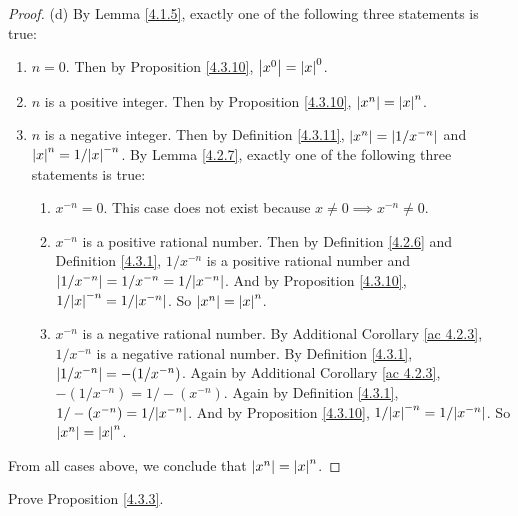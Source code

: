 \begin{proof}{(d)}
    By Lemma \ref{4.1.5}, exactly one of the following three statements is true:
    \begin{enumerate}[label=(\Roman*)]
        \item \(n = 0\).
              Then by Proposition \ref{4.3.10}, \(\abs*{x^0} = \abs*{x}^0\).
        \item \(n\) is a positive integer.
              Then by Proposition \ref{4.3.10}, \(\abs*{x^n} = \abs*{x}^n\).
        \item \(n\) is a negative integer.
              Then by Definition \ref{4.3.11}, \(\abs*{x^n} = \abs*{1 / x^{-n}}\) and \(\abs*{x}^n = 1 / \abs*{x}^{-n}\).
              By Lemma \ref{4.2.7}, exactly one of the following three statements is true:
              \begin{enumerate}[label=(\roman*)]
                  \item \(x^{-n} = 0\).
                        This case does not exist because \(x \neq 0 \implies x^{-n} \neq 0\).
                  \item \(x^{-n}\) is a positive rational number.
                        Then by Definition \ref{4.2.6} and Definition \ref{4.3.1}, \(1 / x^{-n}\) is a positive rational number and \(\abs*{1 / x^{-n}} = 1 / x^{-n} = 1 / \abs*{x^{-n}}\).
                        And by Proposition \ref{4.3.10}, \(1 / \abs*{x}^{-n} = 1 / \abs*{x^{-n}}\).
                        So \(\abs*{x^n} = \abs*{x}^n\).
                  \item \(x^{-n}\) is a negative rational number.
                        By Additional Corollary \ref{ac 4.2.3}, \(1 / x^{-n}\) is a negative rational number.
                        By Definition \ref{4.3.1}, \(\abs*{1 / x^{-n}} = -(1 / x^{-n})\).
                        Again by Additional Corollary \ref{ac 4.2.3}, \(-(1 / x^{-n}) = 1 / -(x^{-n})\).
                        Again by Definition \ref{4.3.1}, \(1 / -(x^{-n}) = 1 / \abs*{x^{-n}}\).
                        And by Proposition \ref{4.3.10}, \(1 / \abs*{x}^{-n} = 1 / \abs*{x^{-n}}\).
                        So \(\abs*{x^n} = \abs*{x}^n\).
              \end{enumerate}
    \end{enumerate}
    From all cases above, we conclude that \(\abs*{x^n} = \abs*{x}^n\).
\end{proof}

\exercisesection

\begin{exercise}\label{ex 4.3.1}
    Prove Proposition \ref{4.3.3}.
\end{exercise}

